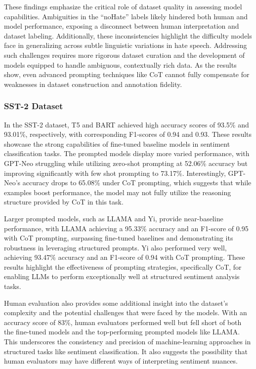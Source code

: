 \documentclass[twocolumn]{article}
\begin{document}
These findings emphasize the critical role of dataset quality in assessing model capabilities. Ambiguities in the “noHate” labels likely hindered both human and model performance, exposing a disconnect between human interpretation and dataset labeling. Additionally, these inconsistencies highlight the difficulty models face in generalizing across subtle linguistic variations in hate speech. Addressing such challenges requires more rigorous dataset curation and the development of models equipped to handle ambiguous, contextually rich data. As the results show, even advanced prompting techniques like CoT cannot fully compensate for weaknesses in dataset construction and annotation fidelity.

\subsubsection{SST-2 Dataset}

In the SST-2 dataset, T5 and BART achieved high accuracy scores of 93.5\% and 93.01\%, respectively, with corresponding F1-scores of 0.94 and 0.93. These results showcase the strong capabilities of fine-tuned baseline models in sentiment classification tasks. The prompted models display more varied performance, with GPT-Neo struggling while utilizing zero-shot prompting at 52.06\% accuracy but improving significantly with few shot prompting to 73.17\%. Interestingly, GPT-Neo’s accuracy drops to 65.08\% under CoT prompting, which suggests that while examples boost performance, the model may not fully utilize the reasoning structure provided by CoT in this task.

Larger prompted models, such as LLAMA and Yi, provide near-baseline performance, with LLAMA achieving a 95.33\% accuracy and an F1-score of 0.95 with CoT prompting, surpassing fine-tuned baselines and demonstrating its robustness in leveraging structured prompts. Yi also performed very well, achieving 93.47\% accuracy and an F1-score of 0.94 with CoT prompting. These results highlight the effectiveness of prompting strategies, specifically CoT, for enabling LLMs to perform exceptionally well at structured sentiment analysis tasks.

Human evaluation also provides some additional insight into the dataset’s complexity and the potential challenges that were faced by the models. With an accuracy score of 83\%, human evaluators performed well but fell short of both the fine-tuned models and the top-performing prompted models like LLAMA. This underscores the consistency and precision of machine-learning approaches in structured tasks like sentiment classification. It also suggests the possibility that human evaluators may have different ways of interpreting sentiment nuances.
\end{document}
